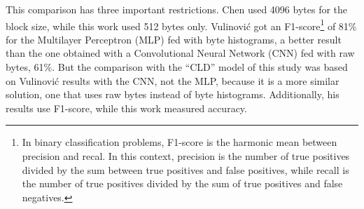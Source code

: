 This comparison has three important restrictions.
Chen used 4096 bytes for the block size, while this work used 512 bytes only.
Vulinović got an F1-score\footnote{
    In binary classification problems, F1-score is the harmonic mean between precision and recal. In this context, precision is the number of true positives divided by the sum between true positives and false positives, while recall is the number of true positives divided by the sum of true positives and false negatives.
} of 81\% for the Multilayer Perceptron (MLP) fed with byte histograms, a better result than the one obtained with a Convolutional Neural Network (CNN) fed with raw bytes, 61\%. But the comparison with the ``CLD'' model of this study was based on Vulinović results with the CNN, not the MLP, because it is a more similar solution, one that uses raw bytes instead of byte histograms. Additionally, his results use F1-score, while this work measured accuracy. 

